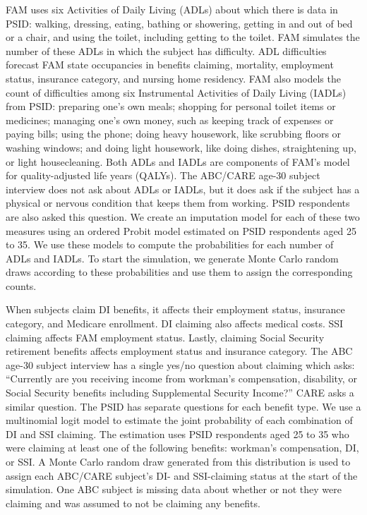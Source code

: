 \noindent FAM uses six Activities of Daily Living (ADLs) about which there is data in PSID: walking, dressing, eating, bathing or showering, getting in and out of bed or a chair, and using the toilet, including getting to the toilet.
FAM simulates the number of these ADLs in which the subject has difficulty.
ADL difficulties forecast FAM state occupancies in benefits claiming, mortality, employment status, insurance category, and nursing home residency.
FAM also models the count of difficulties among six Instrumental Activities of Daily Living (IADLs) from PSID: preparing one's own meals; shopping for personal toilet items or medicines; managing one's own money, such as keeping track of expenses or paying bills; using the phone; doing heavy housework, like scrubbing floors or washing windows; and doing light housework, like doing dishes, straightening up, or light housecleaning.
Both ADLs and IADLs are components of FAM's model for quality-adjusted life years (QALYs).
The ABC/CARE age-30 subject interview does not ask about ADLs or IADLs, but it does ask if the subject has a physical or nervous condition that keeps them from working.
PSID respondents are also asked this question.
We create an imputation model for each of these two measures using an ordered Probit model estimated on PSID respondents aged 25 to 35.
We use these models to compute the probabilities for each number of ADLs and IADLs. To start the simulation, we generate Monte Carlo random draws according to these probabilities and use them to assign the corresponding counts.

\noindent When subjects claim DI benefits, it affects their employment status, insurance category, and Medicare enrollment.
DI claiming also affects medical costs.
SSI claiming affects FAM employment status.
Lastly, claiming Social Security retirement benefits affects employment status and insurance category.
The ABC age-30 subject interview has a single yes/no question about claiming which asks: ``Currently are you receiving income from workman's compensation, disability, or Social Security benefits including Supplemental Security Income?'' CARE asks a similar question. The PSID has separate questions for each benefit type. We use a multinomial logit model to estimate the joint probability of each combination of DI and SSI claiming. The estimation uses PSID respondents aged 25 to 35 who were claiming at least one of the following benefits: workman's compensation, DI, or SSI. A Monte Carlo random draw generated from this distribution is used to assign each ABC/CARE subject's DI- and SSI-claiming status at the start of the simulation. One ABC subject is missing data about whether or not they were claiming and was assumed to not be claiming any benefits.

